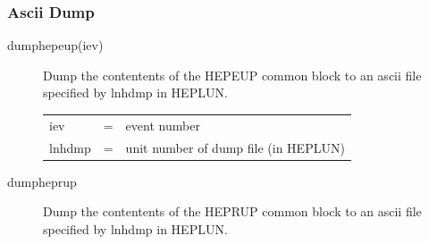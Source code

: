 \subsubsection{Ascii Dump}

\begin{description}

\item[dumphepeup(iev)]
 Dump the contentents of the HEPEUP common block to an ascii file
 specified by lnhdmp in HEPLUN.

\begin{tabular}{lcl}
iev & = & event number \\
lnhdmp & = & unit number of dump file (in HEPLUN) \\
\end{tabular}

\item[dumpheprup]
 Dump the contentents of the HEPRUP common block to an ascii file
 specified by lnhdmp in HEPLUN.

\end{description}

